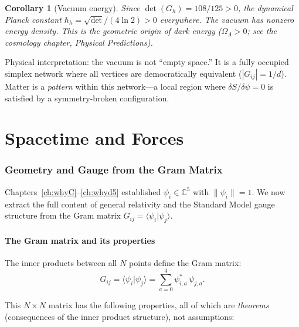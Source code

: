 \documentclass[12pt]{article}
\newtheorem{corollary}[theorem]{Corollary}
\theoremstyle{remark}
\theoremstyle{definition}
\newcommand{\CC}{\mathbb{C}}
\begin{document}
\begin{corollary}[Vacuum energy]
Since $\det(G_h) = 108/125 > 0$, the dynamical Planck constant $\hbar_h = \sqrt{\det}/(4\ln 2) > 0$ everywhere.  The vacuum has nonzero energy density.  This is the geometric origin of dark energy ($\Omega_\Lambda > 0$; see the cosmology chapter, \textit{Physical Predictions}).
\end{corollary}

Physical interpretation: the vacuum is not ``empty space.'' It is a fully occupied simplex network where all vertices are democratically equivalent ($|G_{ij}| = 1/d$).  Matter is a \emph{pattern} within this network---a local region where $\delta S/\delta\psi = 0$ is satisfied by a symmetry-broken configuration.

\part{Spacetime and Forces}

\section{Geometry and Gauge from the Gram Matrix}
\label{ch:geometry}

Chapters~\ref{ch:whyC}--\ref{ch:whyd5} established $\psi_i \in \CC^5$ with $\|\psi_i\| = 1$. We now extract the full content of general relativity and the Standard Model gauge structure from the Gram matrix $G_{ij} = \langle\psi_i|\psi_j\rangle$.

\subsection{The Gram matrix and its properties}

The inner products between all $N$ points define the Gram matrix:
\begin{equation}
G_{ij} = \langle\psi_i|\psi_j\rangle = \sum_{a=0}^{4} \psi^*_{i,a}\,\psi_{j,a}.
\end{equation}

This $N \times N$ matrix has the following properties, all of which are \emph{theorems} (consequences of the inner product structure), not assumptions:
\end{document}
